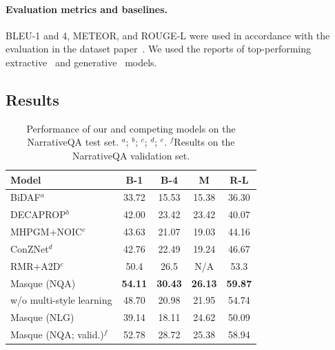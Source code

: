 \documentclass[11pt,a4paper]{article}
\theoremstyle{mydef}
\theoremstyle{myprob}
\begin{document}
\paragraph{Evaluation metrics and baselines.}
BLEU-1 and 4,
METEOR, 
and ROUGE-L were used in accordance with the evaluation in the dataset paper~\citep{KociskySBDHMG18}.
We used the reports of top-performing 
extractive~\citep{SeoKFH17,
TayLHS18,HuPWHLYZ18} and generative~\citep{BauerWB18,IndurthiYBC18}  
models.

\subsection{Results} 

\begin{table}
\centering
{\small \tabcolsep=4.5pt
\begin{tabular}{l|cccc}
\hline
Model & B-1 & B-4 & M & R-L \\ \hline
BiDAF$^a$ & 33.72 & 15.53 & 15.38 & 36.30 \\ 
DECAPROP$^b$ & 42.00 & 23.42 & 23.42 & 40.07 \\
MHPGM+NOIC$^c$ & 43.63 & 21.07 & 19.03 & 44.16 \\
ConZNet$^d$ & 42.76 & 22.49 & 19.24 & 46.67 \\
RMR+A2D$^e$ & 50.4 & 26.5 & N/A & 53.3 
\\ \hline
Masque (NQA) & {\bf 54.11} &{\bf 30.43} & {\bf 26.13} & {\bf 59.87}\\ %
\hspace{0.5em} w/o multi-style learning & 48.70 & 20.98 & 21.95 & 54.74 \\ %
Masque (NLG) & 39.14 & 18.11 & 24.62 & 50.09 \\ %
\hline
\hline
Masque (NQA; valid.)$^f$ & 52.78 & 28.72 & 25.38 & 58.94\\\hline
\end{tabular}
}
\caption{Performance of our and competing models on the NarrativeQA test set. 
$^a$\citet{SeoKFH17}; 
$^b$\citet{TayLHS18};
$^c$\citet{BauerWB18};
$^d$\citet{IndurthiYBC18};
$^e$\citet{HuPWHLYZ18}.
$^f$Results on the NarrativeQA validation set.
}
\label{tb:narrative-test-leaderboard}
\end{table}
\end{document}

